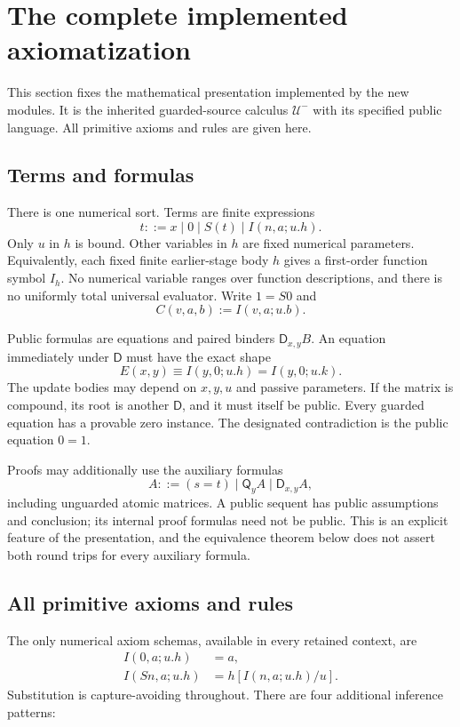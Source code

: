 \documentclass[11pt,letterpaper]{article}
\theoremstyle{definition}\newtheorem{definition}[theorem]{Definition}
\theoremstyle{remark}\newtheorem{remark}[theorem]{Remark}
\newcommand{\Ucal}{\mathcal U^{-}}
\newcommand{\Q}{\mathsf Q}
\newcommand{\D}{\mathsf D}
\begin{document}
\section{The complete implemented axiomatization}
\label{sec:calculus}

This section fixes the mathematical presentation implemented by the new
modules. It is the inherited guarded-source calculus $\Ucal$ with its
specified public language. All primitive axioms and rules are given here.

\subsection{Terms and formulas}

There is one numerical sort. Terms are finite expressions
\[
 t ::= x\mid 0\mid S(t)\mid I(n,a;u.h).
\]
Only $u$ in $h$ is bound. Other variables in $h$ are fixed numerical
parameters. Equivalently, each fixed finite earlier-stage body $h$ gives a
first-order function symbol $I_h$. No numerical variable ranges over
function descriptions, and there is no uniformly total universal evaluator.
Write $1=S0$ and
\[
 C(v,a,b):=I(v,a;u.b).
\]

Public formulas are equations and paired binders $\D_{x,y}B$.
An equation immediately under $\D$ must have the exact shape
\begin{equation}
 E(x,y)\equiv I(y,0;u.h)=I(y,0;u.k).
 \tag{Guard}\label{eq:guard}
\end{equation}
The update bodies may depend on $x,y,u$ and passive parameters. If the
matrix is compound, its root is another $\D$, and it must itself be public.
Every guarded equation has a provable zero instance. The designated
contradiction is the public equation $0=1$.

Proofs may additionally use the auxiliary formulas
\[
 A ::= (s=t)\mid \Q_y A\mid \D_{x,y}A,
\]
including unguarded atomic matrices. A public sequent has public assumptions
and conclusion; its internal proof formulas need not be public. This is an
explicit feature of the presentation, and the equivalence theorem below
does not assert both round trips for every auxiliary formula.

\subsection{All primitive axioms and rules}

The only numerical axiom schemas, available in every retained context, are
\begin{align}
 I(0,a;u.h)&=a,\tag{I0}\label{eq:i0}\\
 I(Sn,a;u.h)&=h[I(n,a;u.h)/u].\tag{IS}\label{eq:is}
\end{align}
Substitution is capture-avoiding throughout. There are four additional
inference patterns:
\end{document}
